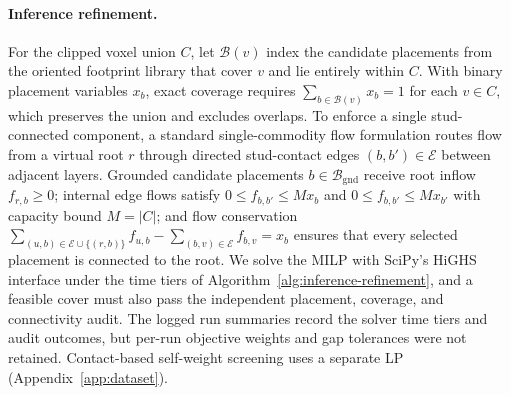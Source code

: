 \paragraph{Inference refinement.}
For the clipped voxel union $C$, let $\mathcal{B}(v)$ index the candidate placements from the oriented footprint library that cover $v$ and lie entirely within $C$. With binary placement variables $x_b$, exact coverage requires $\sum_{b\in\mathcal{B}(v)}x_b=1$ for each $v\in C$, which preserves the union and excludes overlaps. To enforce a single stud-connected component, a standard single-commodity flow formulation routes flow from a virtual root $r$ through directed stud-contact edges $(b,b')\in\mathcal{E}$ between adjacent layers. Grounded candidate placements $b\in\mathcal{B}_{\mathrm{gnd}}$ receive root inflow $f_{r,b}\ge 0$; internal edge flows satisfy $0\le f_{b,b'}\le M x_b$ and $0\le f_{b,b'}\le M x_{b'}$ with capacity bound $M=|C|$; and flow conservation $\sum_{(u,b)\in\mathcal{E}\cup\{(r,b)\}} f_{u,b} - \sum_{(b,v)\in\mathcal{E}} f_{b,v} = x_b$ ensures that every selected placement is connected to the root. We solve the MILP with SciPy's HiGHS interface under the time tiers of Algorithm~\ref{alg:inference-refinement}, and a feasible cover must also pass the independent placement, coverage, and connectivity audit. The logged run summaries record the solver time tiers and audit outcomes, but per-run objective weights and gap tolerances were not retained. Contact-based self-weight screening uses a separate LP (Appendix~\ref{app:dataset}).

